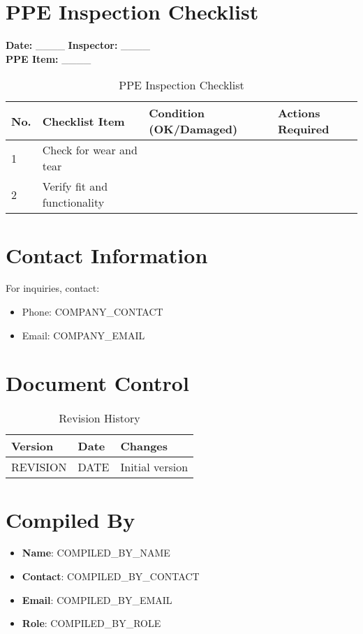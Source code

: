 \documentclass[12pt]{article}
\begin{document}
\section{PPE Inspection Checklist}

\textbf{Date:} \_\_\_\_ \textbf{Inspector:} \_\_\_\_\\
\textbf{PPE Item:} \_\_\_\_

\begin{table}[h]
    \centering
    \begin{tabular}{p{1cm}p{5cm}p{2cm}p{3cm}}
        \toprule
        \textbf{No.} & \textbf{Checklist Item} & \textbf{Condition (OK/Damaged)} & \textbf{Actions Required} \\
        \midrule
        1 & Check for wear and tear & & \\
        2 & Verify fit and functionality & & \\
        \bottomrule
    \end{tabular}
    \caption{PPE Inspection Checklist}
\end{table}

\section{Contact Information}
For inquiries, contact:
\begin{itemize}
    \item Phone: {{COMPANY_CONTACT}}
    \item Email: {{COMPANY_EMAIL}}
\end{itemize}

\section{Document Control}
\begin{table}[h]
    \centering
    \begin{tabular}{p{3cm}p{3cm}p{6cm}}
        \toprule
        \textbf{Version} & \textbf{Date} & \textbf{Changes} \\
        \midrule
        {{REVISION}} & {{DATE}} & Initial version \\
        \bottomrule
    \end{tabular}
    \caption{Revision History}
\end{table}

\section{Compiled By}
\begin{itemize}
    \item \textbf{Name}: {{COMPILED_BY_NAME}}
    \item \textbf{Contact}: {{COMPILED_BY_CONTACT}}
    \item \textbf{Email}: {{COMPILED_BY_EMAIL}}
    \item \textbf{Role}: {{COMPILED_BY_ROLE}}
\end{itemize}
\end{document}

